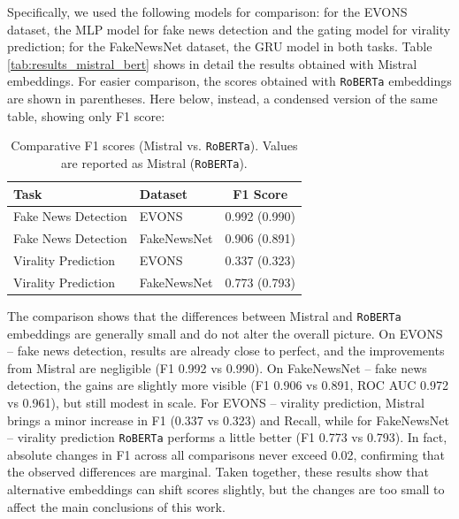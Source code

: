 \documentclass[a4paper,twoside,12pt]{book}
\begin{document}
Specifically, we used the following models for comparison: for the EVONS dataset, the MLP model for fake news detection and the gating model for virality prediction; for the FakeNewsNet dataset, the GRU model in both tasks. Table \ref{tab:results_mistral_bert} shows in detail the results obtained with Mistral embeddings. For easier comparison, the scores obtained with \texttt{RoBERTa} embeddings are shown in parentheses. Here below, instead, a condensed version of the same table, showing only F1 score:

\begin{table}[H]
	\centering
	\caption*{Comparative F1 scores (Mistral vs. \texttt{RoBERTa}). Values are reported as Mistral (\texttt{RoBERTa}).}
	\label{tab:f1_mistral_bert}
	\begin{tabular}{llc}
		\toprule
		\textbf{Task} & \textbf{Dataset} & \textbf{F1 Score} \\
		\midrule
		Fake News Detection & EVONS       & 0.992 (0.990) \\
		Fake News Detection & FakeNewsNet & 0.906 (0.891) \\
		Virality Prediction & EVONS       & 0.337 (0.323) \\
		Virality Prediction & FakeNewsNet & 0.773 (0.793) \\
		\bottomrule
	\end{tabular}
\end{table}

The comparison shows that the differences between Mistral and \texttt{RoBERTa} embeddings are generally small and do not alter the overall picture. On EVONS -- fake news detection, results are already close to perfect, and the improvements from Mistral are negligible (F1 0.992 vs 0.990). On FakeNewsNet -- fake news detection, the gains are slightly more visible (F1 0.906 vs 0.891, ROC AUC 0.972 vs 0.961), but still modest in scale. For EVONS -- virality prediction, Mistral brings a minor increase in F1 (0.337 vs 0.323) and Recall, while for FakeNewsNet -- virality prediction \texttt{RoBERTa} performs a little better (F1 0.773 vs 0.793). In fact, absolute changes in F1 across all comparisons never exceed 0.02, confirming that the observed differences are marginal. Taken together, these results show that alternative embeddings can shift scores slightly, but the changes are too small to affect the main conclusions of this work.
\end{document}
